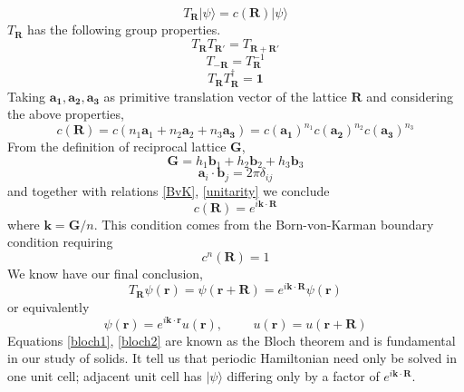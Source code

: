 \documentclass{article}
\begin{document}
\begin{equation}
	T_{\mathbf{R}}|\psi\rangle=c(\mathbf{R})|\psi\rangle
\end{equation}
$T_{\mathbf{R}}$ has the following group properties.
\begin{equation}
	T_{\mathbf{R}}T_{\mathbf{R'}}=T_{\mathbf{R+R'}}
\end{equation}
\begin{equation}
	T_{\mathbf{-R}}=T_{\mathbf{R}}^{-1}
\end{equation}
\begin{equation}
	T_\mathbf{R}T_{\mathbf{R}}^{\dagger}=\mathbf{1}\label{unitarity}
\end{equation}
Taking $\mathbf{a_{1}},\mathbf{a_{2}},\mathbf{a_{3}}$ as primitive translation vector of the lattice $\mathbf{R}$ and considering the above properties,
\begin{equation} c(\mathbf{R})=c(n_{1}\mathbf{a}_{1}+n_{2}\mathbf{a}_{2}+n_{3}\mathbf{a_{3}})=c(\mathbf{a_{1}})^{n_{1}}c(\mathbf{a_{2}})^{n_{2}}c(\mathbf{a_{3}})^{n_{3}}
\end{equation}
From the definition of reciprocal lattice $\mathbf{G}$,
\begin{equation}
	\mathbf{G}=h_{1}\mathbf{b}_{1}+h_{2}\mathbf{b}_{2}+h_{3}\mathbf{b}_{3}
\end{equation}
\begin{equation}
	\mathbf{a}_{i}\cdot\mathbf{b}_{j}=2\pi\delta_{ij}
\end{equation}
and together with relations \eqref{BvK}, \eqref{unitarity}  we conclude
\begin{equation}
	c(\mathbf{R})=e^{i\mathbf{k\cdot R}}
\end{equation}
where $\mathbf{k}=\mathbf{G}/n$. This condition comes from the Born-von-Karman boundary condition requiring
\begin{equation}
	c^{n}(\mathbf{R})=1
\end{equation}
We know have our final conclusion,
\begin{equation}
	T_{\mathbf{R}}\psi(\mathbf{r})=\psi(\mathbf{r+R})=e^{i\mathbf{k}\cdot\mathbf{R}}\psi(\mathbf{r})\label{bloch1}
\end{equation}
or equivalently
\begin{equation}
	\psi(\mathbf{r})=e^{i\mathbf{k}\cdot\mathbf{r}}u(\mathbf{r}),\hspace{1cm}u(\mathbf{r})=u(\mathbf{r}+\mathbf{R})\label{bloch2}
\end{equation}
Equations \eqref{bloch1}, \eqref{bloch2} are known as the Bloch theorem and is fundamental in our study of solids. It tell us that periodic Hamiltonian need only be solved in one unit cell; adjacent unit cell has $|\psi\rangle$ differing only by a factor of $e^{i\mathbf{k}\cdot\mathbf{R}}$.\\
\end{document}
